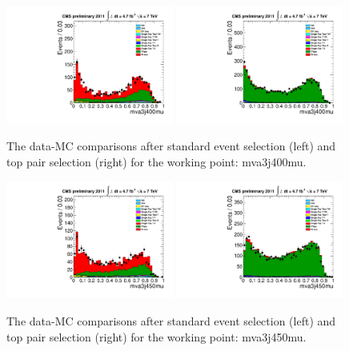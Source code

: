 \begin{figure}[!t]
  \centering
  \includegraphics[width=0.49\textwidth]{figs/cl-mva3j400mu-normal.pdf}
  \includegraphics[width=0.49\textwidth]{figs/cl-mva3j400mu-inTTbar.pdf}
  \caption{\label{fig:mva:plots-mva3j400mu} The data-MC comparisons
    after standard event selection (left) and top pair
    selection (right) for the working point: mva3j400mu.}
\end{figure}

\begin{figure}[!t]
  \centering
  \includegraphics[width=0.49\textwidth]{figs/cl-mva3j450mu-normal.pdf}
  \includegraphics[width=0.49\textwidth]{figs/cl-mva3j450mu-inTTbar.pdf}
  \caption{\label{fig:mva:plots-mva3j450mu} The data-MC comparisons
    after standard event selection (left) and top pair
    selection (right) for the working point: mva3j450mu.}
\end{figure}

